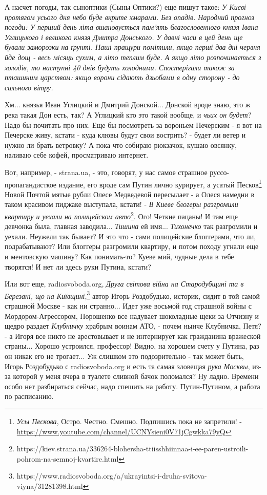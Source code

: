А насчет погоды, так сыноптики (Сыны Оптики?) еще пишут такое: \emph{У Києві
протягом усього дня небо буде вкрите хмарами.  Без опадів. Народний прогноз
погоди: У перший день літа вшановується пам'ять благословенного князя Івана
Углицького і великого князя Дмитра Донського. У давні часи в цей день ще бували
заморозки на ґрунті.  Наші пращури помітили, якщо перші два дні червня йде дощ
- весь місяць сухим, а літо теплим буде. А якщо літо розпочинається з холодів,
то наступні 40 днів будуть холодними.  Спостерігали також за пташиним царством:
якщо ворони сідають дзьобами в одну сторону - до сильного вітру.}

Хм... князья Иван Углицкий и Дмитрий Донской... Донской вроде знаю, это ж река
такая Дон есть, так? А Углицкий кто это такой вообще, и \emph{чьих он будет}?
Надо бы почитать про них. Еще бы посмотреть за вороньем Печерским - я вот на
Печерске живу, кстати - куда клювы будут свои вострить? - будет ли ветер и
нужно ли брать ветровку?  А пока что собираю рюкзачок, кушаю овсянку, наливаю
себе кофей, просматриваю интернет. 

Вот, например, - strana.ua, - это, говорят, у нас самое страшное
руссо-пропагандисткое издание, его вроде сам Путин лично курирует, а усатый
Песков\footnote{\emph{Усы Пескова}, Остро. Честно. Смешно. Подпишись пока не
запретили! - \url{https://www.youtube.com/channel/UCNYsieni0V71jCgwkka79yQ}}
Новой Почтой мятые рубли Олесе Медведевой пересылает - а Олеся намедни в таком
красивом пиджаке выступала, кстати! - \emph{В Киеве блогеры разгромили квартиру
и уехали на полицейском
авто}\footnote{https://kiev.strana.ua/336264-blohersha-ttiisshhiinnaa-i-ee-paren-ustroili-pohrom-na-semnoj-kvartire.html}.
Ого! Четкие пацаны! И там еще девчонка была, главная заводила... \emph{Тишина}
ей имя... \emph{Тихонечко} так разгромили и уехали. Неужели так бывает? И это
что - сами полицейские блоггерами, что ли, подрабатывают? Или блоггеры
разгромили квартиру, и потом походу угнали еще и ментовскую машину? Как
понимать-то? Куеве мий, чудные дела в тебе творятся!  И нет ли здесь руки
Путина, кстати? 

Или вот еще, radiosvoboda.org, \emph{Друга світова війна на Стародубщині та в
Березані, що на
Київщині},\footnote{https://www.radiosvoboda.org/a/ukrayintsi-i-druha-svitova-viyna/31281398.html}
автор Игорь Роздобудько, историк, сидит в той самой страшной Москве - как ни
странно...  Идет уже восьмой год страшной войны с Мордором-Агрессором,
Порошенко все надувает шоколадные щеки за Отчизну и щедро раздает
\emph{Клубничку} храбрым воинам АТО, - почем нынче Клубничка, Петя? - а Игоря
все никто не арестовывает и не интернирует как гражданина вражеской страны...
Хорошо устроился, профессор! Видно, на хорошем счету у Путина, раз он никак его
не трогает... Уж слишком это подозрительно - так может быть, Игорь Роздобудько
с radiosvoboda.org и есть та самая зловещая \emph{рука Москвы}, из-за которой у
меня вчера в туалете сливной бачок поломался? Ну ладно. Времени особо нет
разбираться сейчас, надо спешить на работу. Путин-Путином, а работа по
расписанию.

